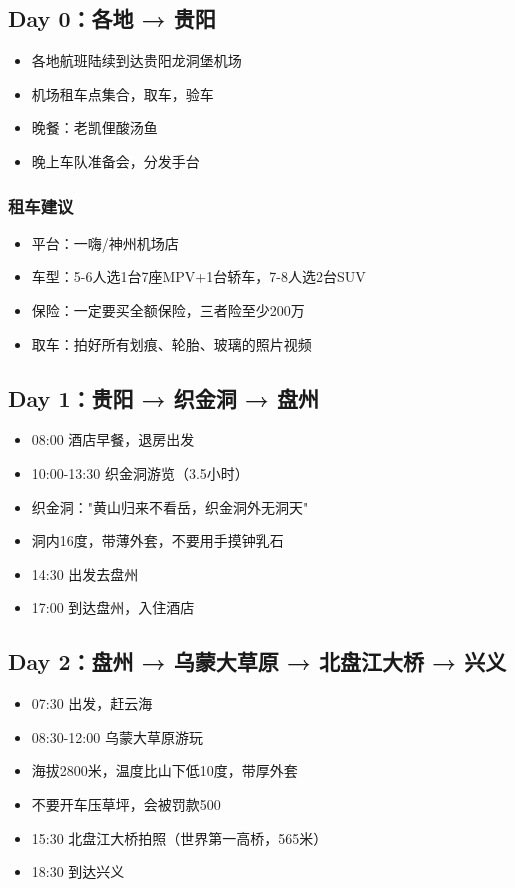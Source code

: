 \documentclass[12pt,a4paper,UTF8]{ctexart}
\begin{document}
\subsection{Day 0：各地 → 贵阳}
\begin{itemize}
\item 各地航班陆续到达贵阳龙洞堡机场
\item 机场租车点集合，取车，验车
\item 晚餐：老凯俚酸汤鱼
\item 晚上车队准备会，分发手台
\end{itemize}

\subsubsection{租车建议}
\begin{itemize}
\item 平台：一嗨/神州机场店
\item 车型：5-6人选1台7座MPV+1台轿车，7-8人选2台SUV
\item 保险：一定要买全额保险，三者险至少200万
\item 取车：拍好所有划痕、轮胎、玻璃的照片视频
\end{itemize}

\subsection{Day 1：贵阳 → 织金洞 → 盘州}
\begin{itemize}
\item 08:00 酒店早餐，退房出发
\item 10:00-13:30 织金洞游览（3.5小时）
\item 织金洞："黄山归来不看岳，织金洞外无洞天"
\item 洞内16度，带薄外套，不要用手摸钟乳石
\item 14:30 出发去盘州
\item 17:00 到达盘州，入住酒店
\end{itemize}

\subsection{Day 2：盘州 → 乌蒙大草原 → 北盘江大桥 → 兴义}
\begin{itemize}
\item 07:30 出发，赶云海
\item 08:30-12:00 乌蒙大草原游玩
\item 海拔2800米，温度比山下低10度，带厚外套
\item 不要开车压草坪，会被罚款500
\item 15:30 北盘江大桥拍照（世界第一高桥，565米）
\item 18:30 到达兴义
\end{itemize}
\end{document}
